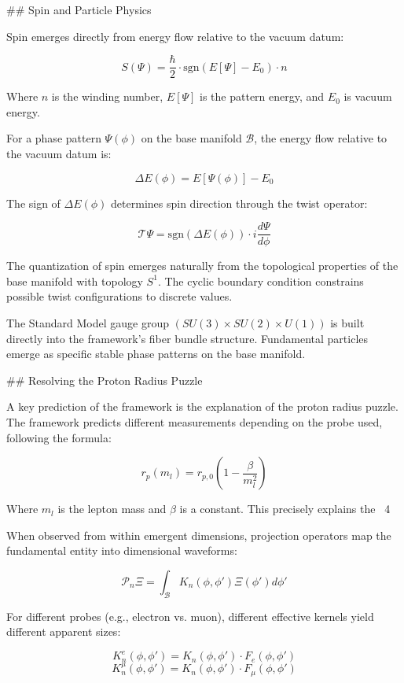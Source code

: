 ## Spin and Particle Physics

Spin emerges directly from energy flow relative to the vacuum datum:

$$S(\Psi) = \frac{\hbar}{2} \cdot \text{sgn}(E[\Psi]-E_0) \cdot n$$

Where $n$ is the winding number, $E[\Psi]$ is the pattern energy, and $E_0$ is vacuum energy.

For a phase pattern $\Psi(\phi)$ on the base manifold $\mathcal{B}$, the energy flow relative to the vacuum datum is:

$$\Delta E(\phi) = E[\Psi(\phi)] - E_0$$

The sign of $\Delta E(\phi)$ determines spin direction through the twist operator:

$$\mathcal{T}\Psi = \text{sgn}(\Delta E(\phi)) \cdot i \frac{d\Psi}{d\phi}$$

The quantization of spin emerges naturally from the topological properties of the base manifold with topology $S^1$. The cyclic boundary condition constrains possible twist configurations to discrete values.

The Standard Model gauge group $(SU(3) \times SU(2) \times U(1))$ is built directly into the framework's fiber bundle structure. Fundamental particles emerge as specific stable phase patterns on the base manifold.

## Resolving the Proton Radius Puzzle

A key prediction of the framework is the explanation of the proton radius puzzle. The framework predicts different measurements depending on the probe used, following the formula:

$$r_p(m_l) = r_{p,0}\left(1 - \frac{\beta}{m_l^2}\right)$$

Where $m_l$ is the lepton mass and $\beta$ is a constant. This precisely explains the ~4%

When observed from within emergent dimensions, projection operators map the fundamental entity into dimensional waveforms:

$$\mathcal{P}_n\Xi = \int_{\mathcal{B}} K_n(\phi, \phi') \Xi(\phi') d\phi'$$

For different probes (e.g., electron vs. muon), different effective kernels yield different apparent sizes:

$$K_n^{e}(\phi,\phi') = K_n(\phi,\phi') \cdot F_e(\phi,\phi')$$
$$K_n^{\mu}(\phi,\phi') = K_n(\phi,\phi') \cdot F_{\mu}(\phi,\phi')$$

